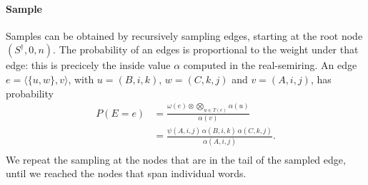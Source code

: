   \paragraph{Sample}
    Samples can be obtained by recursively sampling edges, starting at the root node $(S^{\dagger}, 0, n)$. The probability of an edges is proportional to the weight under that edge: this is precicely the inside value $\alpha$ computed in the real-semiring. An edge $e = \langle \{ u, w \}, v \rangle$, with $u = (B, i, k)$, $w = (C, k, j)$ and $v = (A, i, j)$, has probability
    \begin{align}
      \label{eq:sample}
      P(E = e)
        &= \frac{\omega(e) \otimes \bigotimes_{u \in T(e)} \alpha(u)}{\alpha(v)}  \nonumber  \\
        &= \frac{\psi(A, i, j) \, \alpha(B, i, k) \, \alpha(C, k, j)}{\alpha(A, i, j)}.  \\
    \end{align}
    We repeat the sampling at the nodes that are in the tail of the sampled edge, until we reached the nodes that span individual words.

